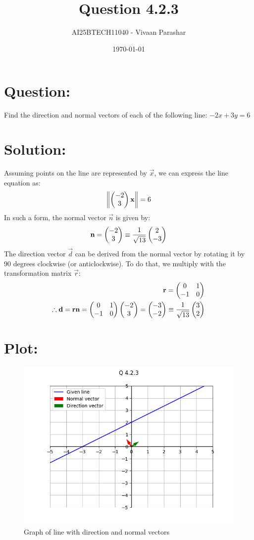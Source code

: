\documentclass[a4paper, 12pt]{article}
\title{Question 4.2.3}
\author{AI25BTECH11040 - Vivaan Parashar}
\date{\today}
\begin{document}
\maketitle

\section{Question: }
Find the direction and normal vectors of each of the following line: $-2x + 3y = 6$

\section{Solution: }
Assuming points on the line are represented by $\vec{x}$, we can express the line equation as:
\begin{align}
    \left\lVert\begin{pmatrix}-2 \\ 3\end{pmatrix}\mathbf{x}\right\rVert = 6
\end{align}
In such a form, the normal vector $\vec{n}$ is given by:
\begin{align}
    \mathbf{n} = \begin{pmatrix}-2 \\ 3\end{pmatrix} \equiv \frac{1}{\sqrt{13}}\begin{pmatrix}2 \\ -3\end{pmatrix}
\end{align}
The direction vector $\vec{d}$ can be derived from the normal vector by rotating it by 90 degrees clockwise (or anticlockwise). To do that, we multiply with the transformation matrix $\vec{r}$:
\begin{align}
    \mathbf{r} = \begin{pmatrix}0 & 1 \\ -1 & 0\end{pmatrix}\\
    \therefore \mathbf{d} = \mathbf{r}\mathbf{n} = \begin{pmatrix}0 & 1 \\ -1 & 0\end{pmatrix}\begin{pmatrix}-2 \\ 3\end{pmatrix} = \begin{pmatrix}-3 \\ -2\end{pmatrix} \equiv \frac{1}{\sqrt{13}}\begin{pmatrix}3 \\ 2\end{pmatrix}
\end{align}

\section{Plot: }
\begin{figure}[h!]
    \centering
    \includegraphics[width=\columnwidth]{figs/plot.png}
    \caption{Graph of line with direction and normal vectors}
    \label{fig:4.2.3}
\end{figure}
\end{document}
